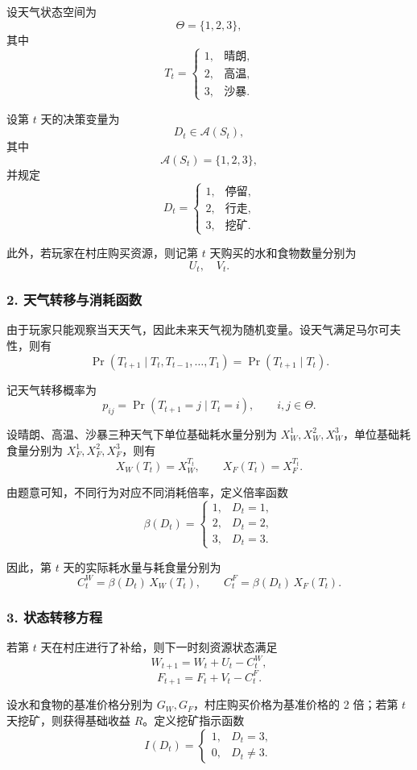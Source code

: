 \documentclass[UTF8,a4paper,12pt]{ctexart}
\begin{document}
设天气状态空间为
\[
\Theta=\{1,2,3\},
\]
其中
\[
T_t=
\begin{cases}
1, & \text{晴朗},\\
2, & \text{高温},\\
3, & \text{沙暴}.
\end{cases}
\]

设第 $t$ 天的决策变量为
\[
D_t\in \mathcal{A}(S_t),
\]
其中
\[
\mathcal{A}(S_t)=\{1,2,3\},
\]
并规定
\[
D_t=
\begin{cases}
1, & \text{停留},\\
2, & \text{行走},\\
3, & \text{挖矿}.
\end{cases}
\]

此外，若玩家在村庄购买资源，则记第 $t$ 天购买的水和食物数量分别为
\[
U_t,\quad V_t.
\]

\subsubsection*{2. 天气转移与消耗函数}

由于玩家只能观察当天天气，因此未来天气视为随机变量。设天气满足马尔可夫性，则有
\[
\Pr(T_{t+1}\mid T_t,T_{t-1},\dots,T_1)=\Pr(T_{t+1}\mid T_t).
\]

记天气转移概率为
\[
p_{ij}=\Pr(T_{t+1}=j\mid T_t=i),\qquad i,j\in\Theta.
\]

设晴朗、高温、沙暴三种天气下单位基础耗水量分别为 $X_W^{1},X_W^{2},X_W^{3}$，单位基础耗食量分别为 $X_F^{1},X_F^{2},X_F^{3}$，则有
\[
X_W(T_t)=X_W^{T_t},\qquad X_F(T_t)=X_F^{T_t}.
\]

由题意可知，不同行为对应不同消耗倍率，定义倍率函数
\[
\beta(D_t)=
\begin{cases}
1, & D_t=1,\\
2, & D_t=2,\\
3, & D_t=3.
\end{cases}
\]

因此，第 $t$ 天的实际耗水量与耗食量分别为
\[
C_t^W=\beta(D_t)\,X_W(T_t),
\qquad
C_t^F=\beta(D_t)\,X_F(T_t).
\]

\subsubsection*{3. 状态转移方程}

若第 $t$ 天在村庄进行了补给，则下一时刻资源状态满足
\[
W_{t+1}=W_t+U_t-C_t^W,
\]
\[
F_{t+1}=F_t+V_t-C_t^F.
\]

设水和食物的基准价格分别为 $G_W,G_F$，村庄购买价格为基准价格的 2 倍；若第 $t$ 天挖矿，则获得基础收益 $R$。定义挖矿指示函数
\[
I(D_t)=
\begin{cases}
1, & D_t=3,\\
0, & D_t\neq 3.
\end{cases}
\]
\end{document}

